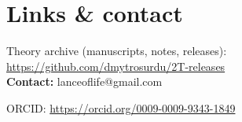 \documentclass[10.5pt,a4paper]{article}
\begin{document}
\section*{Links \& contact}\label{sec:uom-summary-004}
Theory archive (manuscripts, notes, releases): \url{https://github.com/dmytrosurdu/2T-releases}\\

\textbf{Contact:} lanceoflife@gmail.com

ORCID: \url{https://orcid.org/0009-0009-9343-1849}
\end{document}
